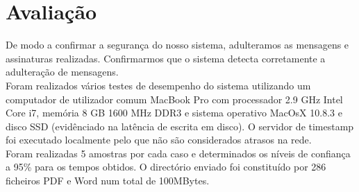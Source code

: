 \newpage
\chapter{Avaliação}
\label{chapter:evaluation}
De modo a confirmar a segurança do nosso sistema, adulteramos as mensagens e 
assinaturas realizadas. Confirmarmos que o sistema detecta corretamente a adulteração de mensagens. 
\\
Foram realizados vários testes de desempenho do sistema utilizando um computador de utilizador comum MacBook Pro com processador 2.9 GHz Intel Core i7, memória 8 GB 1600 MHz DDR3 e sistema operativo MacOsX 10.8.3 e disco SSD (evidênciado na latência de escrita em disco). O servidor de timestamp foi executado localmente pelo que não são considerados atrasos na rede.\\
Foram realizadas 5 amostras por cada caso e determinados os níveis de confiança a 95\% para os tempos obtidos. O directório enviado foi constituído por  286 ficheiros PDF e Word num total de 100MBytes. \\
